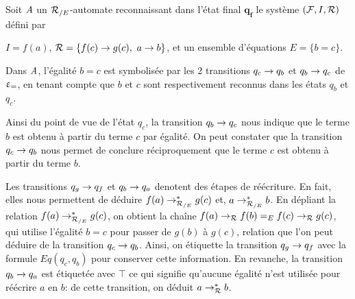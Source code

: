 \begin{example}
  \label{ex:semantics}
  Soit $\mathit A$ un ${\mathcal R_{/E}}$-automate reconnaissant dans l'état final $\mathbf{q_f}$
  le système $(\mathcal{F}, I, \mathcal R)$ défini par 

  $I = f(a)$, $\mathcal R = \{f(c) \rightarrow g(c),\ a \rightarrow b\}$, et un ensemble d'équations $E = \{ b = c\}$.

  Dans $\mathit A$, l'égalité $b = c$ est symbolisée par les 2 transitions $q_c
  \rightarrow q_b$ et $q_b \rightarrow q_c$ de $\upvarepsilon_{=}$, en tenant compte que $b$ et $c$
  sont respectivement reconnus dans les états $q_b$ et $q_c$.
  
  Ainsi du point de vue de l'état $q_c$, la transition $q_b \rightarrow q_c$
  nous indique que le terme $b$ est obtenu à partir du terme $c$ par égalité.
  On peut constater que la transition $q_c \rightarrow q_b$ nous permet 
  de conclure réciproquement que le terme $c$ est obtenu à partir du terme $b$.

  Les transitions $q_g \rightarrow q_f$ et $q_b \rightarrow q_a$ denotent des étapes de réécriture.
  En fait, elles nous permettent de déduire $f(a) \rightarrow^*_{\mathcal R_{/E}} g(c)$ et, $a \rightarrow^*_{\mathcal R_{/E}} b$.
  En dépliant la relation $f(a) \rightarrow^*_{\mathcal R_{/E}} g(c)$, on obtient la chaîne $f(a) \rightarrow_\mathcal R f(b) =_E f(c) \rightarrow_\mathcal R g(c)$, 
  qui utilise l'égalité $b = c$ pour passer de $g(b)$ à $g(c)$, relation que l'on peut 
  déduire de la transition $q_c \rightarrow q_b$. Ainsi, on étiquette la transition $q_g \rightarrow q_f$
  avec la formule $Eq(q_c, q_b)$ pour conserver cette information. 
  En revanche, la transition $q_b \rightarrow q_a$ est étiquetée avec $\top$ ce qui signifie 
  qu'aucune égalité n'est utilisée pour réécrire $a$ en $b$: de cette transition, on déduit $a \rightarrow^*_\mathcal R b$.
  \begin{center}
  \end{center}
\end{example}

